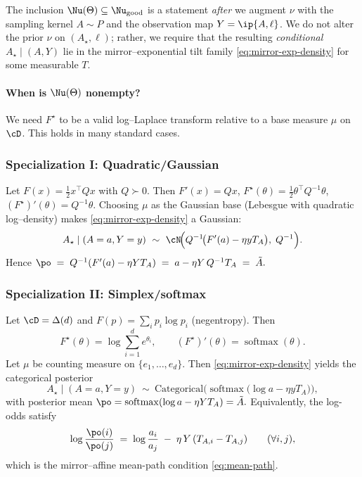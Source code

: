 \begin{remark}
    The inclusion $\Nu(\Theta)\subseteq \Nu_{\text{good}}$ is a statement \emph{after} we augment $\nu$ with the sampling kernel $A\sim P$ and the observation map $Y=\ip{A,\ell}$. We do not alter the prior $\nu$ on $(A_\star,\ell)$; rather, we require that the resulting \emph{conditional} $A_\star\mid(A,Y)$ lie in the mirror–exponential tilt family \eqref{eq:mirror-exp-density} for some measurable $T$.
\end{remark}

\paragraph{When is $\Nu(\Theta)$ nonempty?}
We need $F^\star$ to be a valid log–Laplace transform relative to a base measure $\mu$ on $\cD$. This holds in many standard cases.

\subsubsection*{Specialization I: Quadratic/Gaussian}
Let $F(x)=\tfrac12 x^\top Q x$ with $Q\succ0$. Then $F'(x)=Qx$, $F^\star(\theta)=\tfrac12\theta^\top Q^{-1}\theta$, $(F^\star)'(\theta)=Q^{-1}\theta$. Choosing $\mu$ as the Gaussian base (Lebesgue with quadratic log–density) makes \eqref{eq:mirror-exp-density} a Gaussian:
\[
    A_\star \mid (A=a,Y=y)\ \sim\ \cN\!\Big(Q^{-1}\!\big(F'(a)-\eta y T_A\big),\; Q^{-1}\Big).
\]
Hence
\(
\po \;=\; Q^{-1}(F'(a)-\eta Y T_A)\;=\; a - \eta Y\,Q^{-1}T_A\;=\;\tilde A.
\)

\subsubsection*{Specialization II: Simplex/softmax}
Let $\cD=\Delta(d)$ and $F(p)=\sum_i p_i\log p_i$ (negentropy). Then
\[
    F^\star(\theta)=\log\sum_{i=1}^d e^{\theta_i},\qquad (F^\star)'(\theta)=\operatorname{softmax}(\theta).
\]
Let $\mu$ be counting measure on $\{e_1,\dots,e_d\}$. Then \eqref{eq:mirror-exp-density} yields the categorical posterior
\[
    A_\star\mid(A=a,Y=y)\ \sim\ \text{Categorical}\!\Big(\operatorname{softmax}\big(\log a - \eta y T_A\big)\Big),
\]
with posterior mean
\(
\po=\operatorname{softmax}(\log a - \eta Y T_A)=\tilde A.
\)
Equivalently, the log-odds satisfy
\[
    \log\frac{\po(i)}{\po(j)} \;=\; \log\frac{a_i}{a_j}\;-\;\eta\,Y\,(T_{A,i}-T_{A,j})\qquad(\forall i,j),
\]
which is the mirror–affine mean-path condition \eqref{eq:mean-path}.

